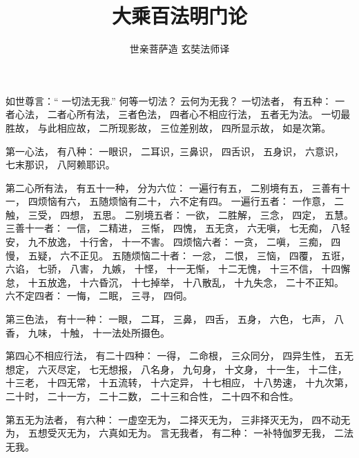 \documentclass[UTF8]{ctexbook}
\begin{document}
\title{大乘百法明门论}
\author{世亲菩萨造 玄奘法师译}
\maketitle
\LARGE

\begin{pinyinscope}
如世尊言：“ 一切法无我.”
何等一切法？ 云何为无我？
一切法者， 有五种： 一者心法， 二者心所有法， 三者色法， 四者心不相应行法， 五者无为法。 一切最胜故， 与此相应故， 二所现影故， 三位差别故， 四所显示故， 如是次第。

第一心法， 有八种： 一眼识， 二耳识，三鼻识， 四舌识， 五身识， 六意识， 七末那识， 八阿赖耶识。

第二心所有法， 有五十一种， 分为六位： 一遍行有五， 二别境有五， 三善有十一， 四烦恼有六， 五随烦恼有二十， 六不定有四。
一遍行五者： 一作意， 二触， 三受， 四想， 五思。
二别境五者： 一欲， 二胜解， 三念， 四定， 五慧。
三善十一者： 一信， 二精进， 三惭， 四愧， 五无贪， 六无嗔， 七无痴， 八轻安， 九不放逸， 十行舍， 十一不害。
四烦恼六者： 一贪， 二嗔， 三痴， 四慢， 五疑， 六不正见。
五随烦恼二十者： 一忿， 二恨， 三恼， 四覆， 五诳， 六谄， 七骄， 八害， 九嫉， 十悭， 十一无惭， 十二无愧， 十三不信， 十四懈怠， 十五放逸， 十六昏沉， 十七掉举， 十八散乱， 十九失念， 二十不正知。
六不定四者： 一悔， 二眠， 三寻， 四伺。

第三色法， 有十一种： 一眼， 二耳， 三鼻， 四舌， 五身， 六色， 七声， 八香， 九味， 十触， 十一法处所摄色。

第四心不相应行法， 有二十四种： 一得， 二命根， 三众同分， 四异生性， 五无想定， 六灭尽定， 七无想报， 八名身， 九句身， 十文身， 十一生， 十二住， 十三老， 十四无常， 十五流转， 十六定异， 十七相应， 十八势速， 十九次第， 二十时， 二十一方， 二十二数， 二十三和合性， 二十四不和合性。
 
 第五无为法者， 有六种： 一虚空无为， 二择灭无为， 三非择灭无为， 四不动无为， 五想受灭无为， 六真如无为。
言无我者， 有二种： 一补特伽罗无我， 二法无我。
\end{pinyinscope}
\end{document}
